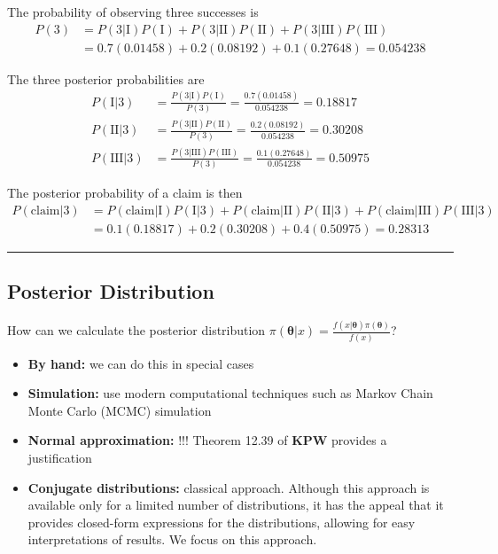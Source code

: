 \documentclass[]{book}
\providecommand{\tightlist}{%
  \setlength{\itemsep}{0pt}\setlength{\parskip}{0pt}}
\theoremstyle{definition}
\theoremstyle{definition}
\theoremstyle{definition}
\theoremstyle{remark}
\begin{document}
The probability of observing three successes is
\[\begin{aligned} P(3) &= P(3|\text{I})P(\text{I}) + P(3|\text{II})P(\text{II}) + P(3|\text{III})P(\text{III}) \\
&=  0.7(0.01458) + 0.2(0.08192) + 0.1(0.27648) = 0.054238
\end{aligned}\]

The three posterior probabilities are \[\begin{aligned}
P(\text{I}|3) &= \frac{P(3|\text{I})P(\text{I})}{P(3)} = \frac{0.7(0.01458)}{0.054238} = 0.18817 \\
P(\text{II}|3) &= \frac{P(3|\text{II})P(\text{II})}{P(3)} = \frac{0.2(0.08192)}{0.054238} = 0.30208 \\
P(\text{III}|3) &= \frac{P(3|\text{III})P(\text{III})}{P(3)} = \frac{0.1(0.27648)}{0.054238} = 0.50975 
\end{aligned}\]

The posterior probability of a claim is then \[\begin{aligned} 
P(\text{claim} | 3) &= P(\text{claim}|\text{I})P(\text{I} | 3) + P(\text{claim} | \text{II})P(\text{II} | 3) + P(\text{claim} | \text{III}) P(\text{III} | 3) \\ 
&= 0.1(0.18817) + 0.2(0.30208) + 0.4(0.50975) = 0.28313
\end{aligned}\]

\begin{center}\rule{0.5\linewidth}{\linethickness}\end{center}

\subsection{Posterior Distribution}\label{posterior-distribution}

How can we calculate the posterior distribution
\(\pi(\boldsymbol \theta | x) =\frac{f(x|\boldsymbol \theta )\pi(\boldsymbol \theta)}{f(x)}\)?

\begin{itemize}
\tightlist
\item
  \textbf{By hand:} we can do this in special cases
\item
  \textbf{Simulation:} use modern computational techniques such as
  Markov Chain Monte Carlo (MCMC) simulation
\item
  \textbf{Normal approximation:} !!! Theorem 12.39 of \textbf{KPW}
  provides a justification
\item
  \textbf{Conjugate distributions:} classical approach. Although this
  approach is available only for a limited number of distributions, it
  has the appeal that it provides closed-form expressions for the
  distributions, allowing for easy interpretations of results. We focus
  on this approach.
\end{itemize}
\end{document}
